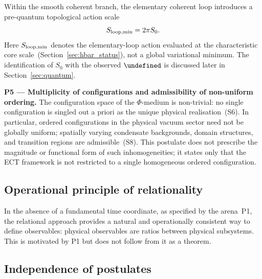 \documentclass[11pt,a4paper]{article}
\let\hbar\undefined
\numberwithin{equation}{section}
\begin{document}
Within the smooth coherent branch, the elementary coherent loop
introduces a pre-quantum topological action scale
\begin{equation}
  \label{eq:Sloop_min}
  S_{\rm loop,min}=2\pi S_0.
\end{equation}
Here $S_{\rm loop,min}$ denotes the elementary-loop action evaluated
at the characteristic core scale~(Section~\ref{sec:hbar_status}),
not a global variational minimum.
The identification of $S_0$ with the observed $\hbar$ is discussed
later in Section~\ref{sec:quantum}.


\medskip
\noindent\textbf{P5 --- Multiplicity of configurations and admissibility of non-uniform ordering.}
\label{eq:P5}
The configuration space of the $\Phi$-medium is non-trivial: no single
configuration is singled out a priori as the unique physical realisation~(S6).
In particular, ordered configurations in the physical vacuum sector need
not be globally uniform; spatially varying condensate backgrounds,
domain structures, and transition regions are admissible~(S8).
This postulate does not prescribe the magnitude or functional form of
such inhomogeneities; it states only that the ECT framework is not
restricted to a single homogeneous ordered configuration.

\subsection{Operational principle of relationality}
\label{subsec:relational}

In the absence of a fundamental time coordinate, as specified by the
arena~P1, the relational approach provides a natural and operationally
consistent way to define observables: physical observables are ratios
between physical subsystems. This is motivated by P1 but does not
follow from it as a theorem.

\subsection{Independence of postulates}
\label{subsec:independence}
\end{document}
